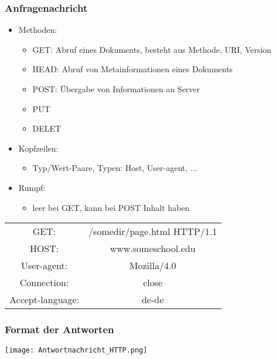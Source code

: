 		\subsubsection{Anfragenachricht}
			\begin{itemize}
				\item Methoden: 
					\begin{itemize}
						\item GET: Abruf eines Dokuments, besteht aus Methode, URI, Version
						\item HEAD: Abruf von Metainformationen eines Dokuments
						\item POST: Übergabe von Informationen an Server
						\item PUT
						\item DELET
					\end{itemize}
				\item Kopfzeilen:
					\begin{itemize}
						\item Typ/Wert-Paare, Typen: Host, User-agent, ...
					\end{itemize}
				\item Rumpf:
					\begin{itemize}
						\item leer bei GET, kann bei POST Inhalt haben
					\end{itemize}
			\end{itemize}
			\begin{center}
				\begin{tabular}{|cc|}
					\hline
					GET: & /somedir/page.html HTTP/1.1 \\
					HOST: & www.someschool.edu \\
					User-agent: & Mozilla/4.0 \\
					Connection: & close \\
					Accept-language: & de-de \\
					\hline
				\end{tabular}
			\end{center}
		\subsubsection{Format der Antworten}
			\texttt{[image: Antwortnachricht\_HTTP.png]}
